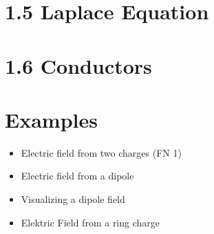 \documentclass[
12pt, reprint, aip, onecolumn, notitlepage
]{revtex4-1}
\begin{document}
\section{1.5 Laplace Equation}


\section{1.6 Conductors}

\section{Examples}
\begin{itemize}
	\item Electric field from two charges (FN 1)
	\item Electric field from a dipole
	\item Visualizing a dipole field
	\item Elektric Field from a ring charge
\end{itemize}
\end{document}
